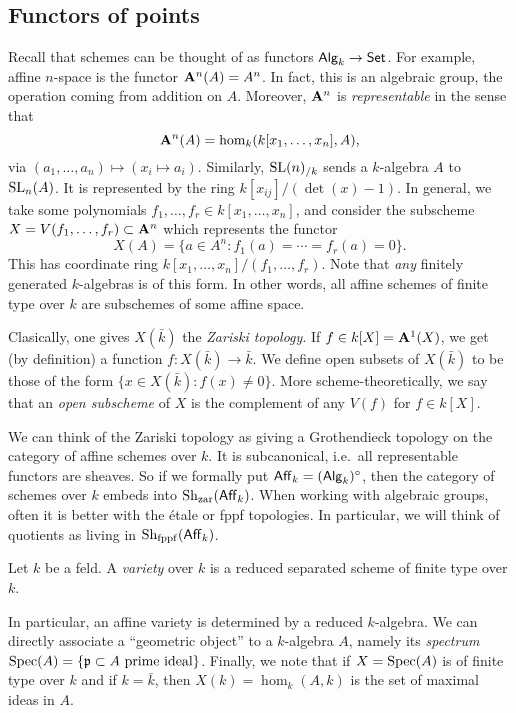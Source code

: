 \subsection{Functors of points}

Recall that schemes can be thought of as functors $\mathsf{Alg}_{k}\to \mathsf{Set}$. For 
example, affine $n$-space is the functor $\mathbf{A}^n(A)=A^n$. In fact, this is an 
algebraic group, the operation coming from addition on $A$. Moreover, $\mathbf{A}^n$ 
is \emph{representable} in the sense that 
\[
  \mathbf{A}^n(A) = \hom_k(k[x_1,\dots,x_n],A) ,
\]
via $(a_1,\dots,a_n)\mapsto (x_i\mapsto a_i)$. Similarly, 
$\operatorname{SL}(n)_{/k}$ sends a $k$-algebra $A$ to $\operatorname{SL}_n(A)$. It is represented by the 
ring $k[x_{i j}]/(\det(x)-1)$. In general, we take some polynomials 
$f_1,\dots,f_r\in k[x_1,\dots,x_n]$, and consider the subscheme 
$X=V(f_1,\dots,f_r)\subset \mathbf{A}^n$ which represents the functor 
\[
  X(A) = \{a\in A^n:f_1(a)=\cdots = f_r(a)=0\} .
\]
This has coordinate ring $k[x_1,\dots,x_n]/(f_1,\dots,f_r)$. Note that 
\emph{any} finitely generated $k$-algebras is of this form. In other words, all 
affine schemes of finite type over $k$ are subschemes of some affine space. 

Clasically, one gives $X(\bar k)$ the \emph{Zariski topology}. If 
$f\in k[X]=\mathbf{A}^1(X)$, we get (by definition) a function 
$f:X(\bar k)\to \bar k$. We define open subsets of $X(\bar k)$ to be 
those of the form $\{x\in X(\bar k):f(x)\ne 0\}$. More scheme-theoretically, 
we say that an \emph{open subscheme} of $X$ is the complement of any 
$V(f)$ for $f\in k[X]$. 

\begin{hard}
We can think of the Zariski topology as giving a Grothendieck topology on the 
category of affine schemes over $k$. It is subcanonical, i.e.~all representable 
functors are sheaves. So if we formally put $\mathsf{Aff}_{k} = (\mathsf{Alg}_{k})^\circ$, 
then the category of schemes over $k$ embeds into 
$\operatorname{Sh}_{\mathrm{zar}}(\mathsf{Aff}_{k})$. When working with algebraic groups, often it is 
better with the \'etale or fppf topologies. In particular, we will think of 
quotients as living in $\operatorname{Sh}_{\mathrm{fppf}}(\mathsf{Aff}_{k})$. 
\end{hard}

\begin{definition}
Let $k$ be a feld. A \emph{variety} over $k$ is a reduced separated scheme of 
finite type over $k$. 
\end{definition}

In particular, an affine variety is determined by a reduced $k$-algebra. We 
can directly associate a ``geometric object'' to a $k$-algebra $A$, namely its 
\emph{spectrum} $\operatorname{Spec}(A)=\{\mathfrak{p}\subset A\text{ prime ideal}\}$. Finally, we 
note that if $X=\operatorname{Spec}(A)$ is of finite type over $k$ and if $k=\bar k$, then 
$X(k)=\hom_k(A,k)$ is the set of maximal ideas in $A$. 





